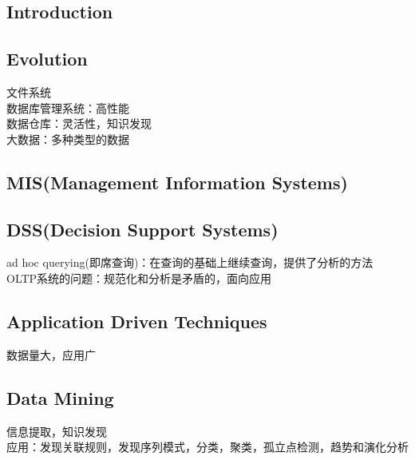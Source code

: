 \documentclass{article}
\begin{document}
\begin{CJK}{UTF8}{gbsn}
	\section{Introduction}
	\subsection{Evolution}
	文件系统\\
	数据库管理系统：高性能\\
	数据仓库：灵活性，知识发现\\
	大数据：多种类型的数据\\
	\subsection{MIS(Management Information Systems)}
	

	\subsection{DSS(Decision Support Systems)}
	ad hoc querying(即席查询)：在查询的基础上继续查询，提供了分析的方法\\
	OLTP系统的问题：规范化和分析是矛盾的，面向应用\\
	
	\subsection{Application Driven Techniques}
	数据量大，应用广\\
	
	
	\subsection{Data Mining}
	信息提取，知识发现\\
	应用：发现关联规则，发现序列模式，分类，聚类，孤立点检测，趋势和演化分析\\
	
\end{CJK}
\end{document}
